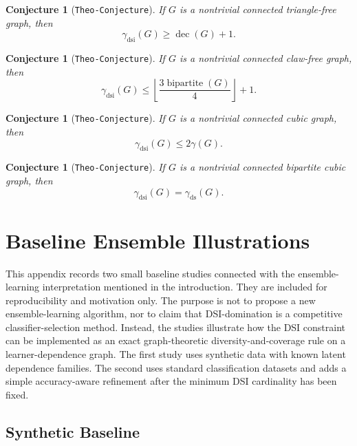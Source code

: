 \documentclass[11pt]{article}
\newtheorem{conjecture}[theorem]{Conjecture}
\theoremstyle{definition}
\theoremstyle{remark}
\newcommand{\ds}{\mathrm{ds}}
\newcommand{\dsi}{\mathrm{dsi}}
\newcommand{\dec}{\operatorname{dec}}
\newcommand{\bipnum}{\operatorname{bipartite}}
\DeclareRobustCommand{\TheoConjecture}{\texttt{Theo-Conjecture}}
\begin{document}
\begin{conjecture}[\TheoConjecture]
\label{conj:trianglefree-lower}
If \(G\) is a nontrivial connected triangle-free graph, then
\[
   \gamma_{\dsi}(G)\ge \dec(G)+1.
\]
\end{conjecture}

\begin{conjecture}[\TheoConjecture]
\label{conj:bipartite-number}
If \(G\) is a nontrivial connected  claw-free graph, then
\[
   \gamma_{\dsi}(G)\le \left\lfloor \frac{3\bipnum(G)}{4}\right\rfloor+1.
\]
\end{conjecture}

\begin{conjecture}[\TheoConjecture]
\label{conj:cubic-domination}
If \(G\) is a nontrivial connected cubic graph, then
\[
   \gamma_{\dsi}(G)\le 2\gamma(G).
\]
\end{conjecture}

\begin{conjecture}[\TheoConjecture]
\label{conj:bipartite-cubic}
If \(G\) is a nontrivial connected bipartite cubic graph, then
\[
   \gamma_{\dsi}(G)=\gamma_{\ds}(G).
\]
\end{conjecture}



\appendix

\section{Baseline Ensemble Illustrations}
\label{app:ensemble-experiment}

This appendix records two small baseline studies connected with the
ensemble-learning interpretation mentioned in the introduction. They are
included for reproducibility and motivation only. The purpose is not to
propose a new ensemble-learning algorithm, nor to claim that
DSI-domination is a competitive classifier-selection method. Instead, the
studies illustrate how the DSI constraint can be implemented as an exact
graph-theoretic diversity-and-coverage rule on a learner-dependence graph.
The first study uses synthetic data with known latent dependence families.
The second uses standard classification datasets and adds a simple
accuracy-aware refinement after the minimum DSI cardinality has been fixed.

\subsection{Synthetic Baseline}
\end{document}
